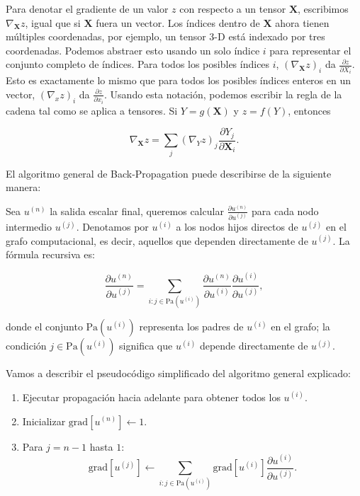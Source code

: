 \vspace{0.3cm}

Para denotar el gradiente de un valor $z$ con respecto a un tensor $\mathbf{X}$, escribimos $\nabla_{\mathbf{X}} z$, igual que si $\mathbf{X}$ fuera un vector. Los índices dentro de $\mathbf{X}$ ahora tienen múltiples coordenadas, por ejemplo, un tensor 3-D está indexado por tres coordenadas. Podemos abstraer esto usando un solo índice $i$ para representar el conjunto completo de índices. Para todos los posibles índices $i$, $(\nabla_{\mathbf{X}} z)_i$ da $\frac{\partial z}{\partial X_i}$. Esto es exactamente lo mismo que para todos los posibles índices enteros en un vector, $(\nabla_x z)_i$ da $\frac{\partial z}{\partial x_i}$. Usando esta notación, podemos escribir la regla de la cadena tal como se aplica a tensores. Si $Y = g(\mathbf{X})$ y $z = f(Y)$, entonces

\[
\nabla_{\mathbf{X}} z = \sum_j (\nabla_Y z)_j \frac{\partial Y_j}{\partial \mathbf{X}_i}. \tag{6.47}
\]

El algoritmo general de Back-Propagation puede describirse de la siguiente manera: 

Sea $u^{(n)}$ la salida escalar final, queremos calcular $\frac{\partial u^{(n)}}{\partial u^{(j)}}$ para cada nodo intermedio $u^{(j)}$. Denotamos por $u^{(i)}$ a los nodos hijos directos de $u^{(j)}$ en el grafo computacional, es decir, aquellos que dependen directamente de $u^{(j)}$. La fórmula recursiva es:

\[
\frac{\partial u^{(n)}}{\partial u^{(j)}} = \sum_{i : j \in \text{Pa}(u^{(i)})} \frac{\partial u^{(n)}}{\partial u^{(i)}} \frac{\partial u^{(i)}}{\partial u^{(j)}},
\]

donde el conjunto $\text{Pa}(u^{(i)})$ representa los padres de $u^{(i)}$ en el grafo; la condición $j \in \text{Pa}(u^{(i)})$ significa que $u^{(i)}$ depende directamente de $u^{(j)}$.

Vamos a describir el pseudocódigo simplificado del algoritmo general explicado:

\begin{enumerate}
    \item Ejecutar propagación hacia adelante para obtener todos los $u^{(i)}$.
    \item Inicializar $\text{grad}[u^{(n)}] \gets 1$.
    \item Para $j = n-1$ hasta $1$:
    \[
    \text{grad}[u^{(j)}] \gets \sum_{i: j \in \text{Pa}(u^{(i)})} \text{grad}[u^{(i)}] \frac{\partial u^{(i)}}{\partial u^{(j)}}.
    \]
\end{enumerate}



